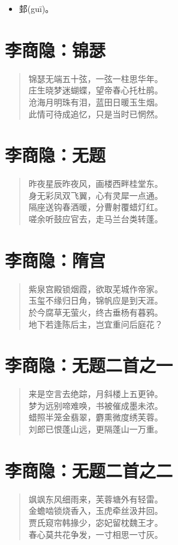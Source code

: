 \documentclass[12pt,oneside]{book}
\newenvironment{shici}{%
\begin{verse}\centering\yanti\large\hspace{12pt}}{\end{verse}}
\begin{document}
\begin{common-format}
\begin{itemize}
\item 邽(guī)。
\end{itemize}

\chapter{李商隐：锦瑟}
\begin{shici}
锦瑟无端五十弦，一弦一柱思华年。\\
庄生晓梦迷蝴蝶，望帝春心托杜鹃。\\
沧海月明珠有泪，蓝田日暖玉生烟。\\
此情可待成追忆，只是当时已惘然。
\end{shici}

\chapter{李商隐：无题}
\begin{shici}
昨夜星辰昨夜风，画楼西畔桂堂东。\\
身无彩凤双飞翼，心有灵犀一点通。\\
隔座送钩春酒暖，分曹射覆蜡灯红。\\
嗟余听鼓应官去，走马兰台类转蓬。
\end{shici}

\chapter{李商隐：隋宫}
\begin{shici}
紫泉宫殿锁烟霞，欲取芜城作帝家。\\
玉玺不缘归日角，锦帆应是到天涯。\\
於今腐草无萤火，终古垂杨有暮鸦。\\
地下若逢陈后主，岂宜重问后庭花？
\end{shici}

\chapter{李商隐：无题二首之一}
\begin{shici}
来是空言去绝踪，月斜楼上五更钟。\\
梦为远别啼难唤，书被催成墨未浓。\\
蜡照半笼金翡翠，麝熏微度绣芙蓉。\\
刘郎已恨蓬山远，更隔蓬山一万重。
\end{shici}

\chapter{李商隐：无题二首之二}
\begin{shici}
飒飒东风细雨来，芙蓉塘外有轻雷。\\
金蟾啮锁烧香入，玉虎牵丝汲井回。\\
贾氏窥帘韩掾少，宓妃留枕魏王才。\\
春心莫共花争发，一寸相思一寸灰。
\end{shici}


\end{common-format}
\end{document}
